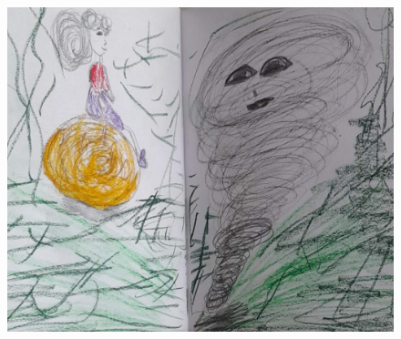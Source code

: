 \documentclass[12pt, a4paper, twoside]{book} %
\begin{document}
\begin{figure}[H]
	\centering
	\includegraphics[width=\textwidth]{./images/1f81324df3ed55.jpg}
\end{figure}
\end{document}
